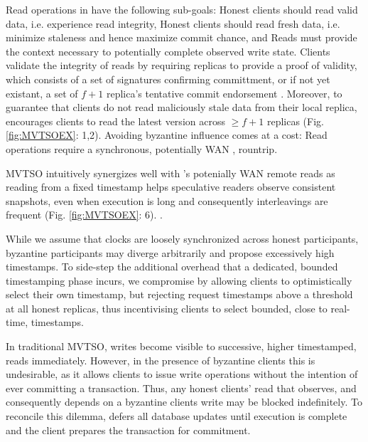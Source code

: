 Read operations in \sys have the following sub-goals: \one Honest clients should read valid data, i.e. experience read integrity, \two Honest clients should read fresh data, i.e. minimize staleness and hence maximize commit chance, and \three Reads must provide the context necessary to potentially complete observed write state. 
Clients validate the integrity of reads by requiring replicas to provide a proof of validity, which consists of a set of signatures confirming committment, or if not yet existant, a set of  $f+1$ replica's tentative commit endorsement . Moreover, to guarantee that clients do not read maliciously stale data from their local replica, \sys encourages clients to read the latest version across $\geq f+1$ replicas (Fig. \ref{fig:MVTSOEX}: 1,2).
Avoiding byzantine influence comes at a cost: Read operations require a synchronous, potentially WAN , rountrip. 

MVTSO intuitively synergizes well with \sys{}'s potenially WAN remote reads as reading from a fixed timestamp helps speculative readers observe consistent snapshots, even when execution is long and consequently interleavings are frequent (Fig. \ref{fig:MVTSOEX}: 6). .

While we assume that clocks are loosely synchronized across honest participants, byzantine participants may diverge arbitrarily and propose excessively high timestamps. To side-step the additional overhead that a dedicated, bounded timestamping phase \cite{Clairvoyant} incurs, we compromise by allowing clients to optimistically select their own timestamp, but rejecting request timestamps above a threshold at all honest replicas, thus incentivising clients to select bounded, close to real-time, timestamps. 

In traditional MVTSO, writes become visible to successive, higher timestamped, reads immediately. However, in the presence of byzantine clients this is undesirable, as it allows clients to issue write operations without the intention of ever committing a transaction. Thus, any honest clients' read that observes, and consequently depends on a byzantine clients write may be blocked indefinitely.
To reconcile this dilemma, \sys{} defers all database updates until execution is complete and the client prepares the transaction for commitment. 

